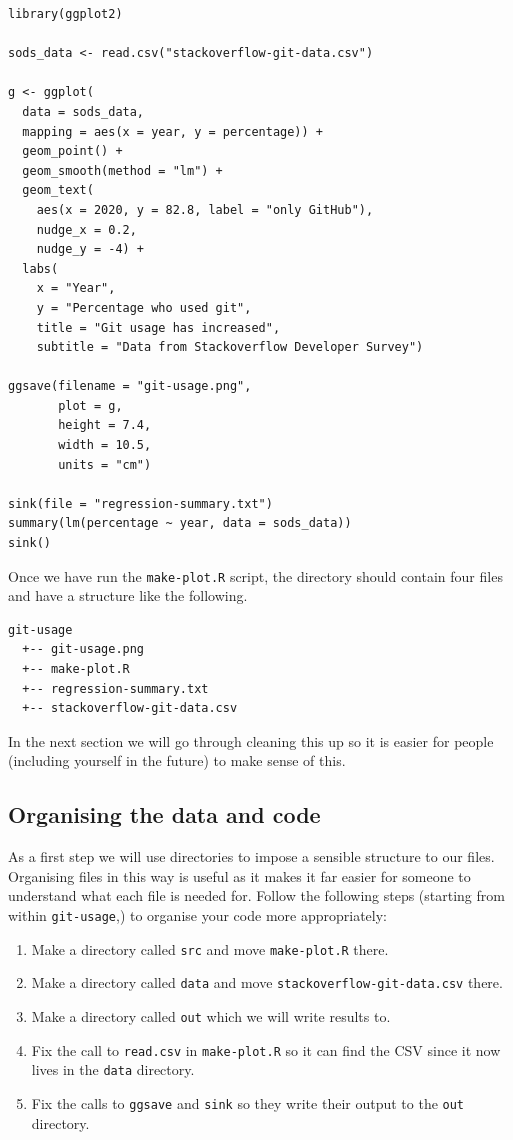 \documentclass[11pt,onecolumn]{scrartcl}
\begin{document}
\lstset{language=r,label= ,caption= ,captionpos=b,numbers=none}
\begin{lstlisting}
library(ggplot2)

sods_data <- read.csv("stackoverflow-git-data.csv")

g <- ggplot(
  data = sods_data,
  mapping = aes(x = year, y = percentage)) +
  geom_point() +
  geom_smooth(method = "lm") +
  geom_text(
    aes(x = 2020, y = 82.8, label = "only GitHub"),
    nudge_x = 0.2,
    nudge_y = -4) +
  labs(
    x = "Year",
    y = "Percentage who used git",
    title = "Git usage has increased",
    subtitle = "Data from Stackoverflow Developer Survey")

ggsave(filename = "git-usage.png",
       plot = g,
       height = 7.4,
       width = 10.5,
       units = "cm")

sink(file = "regression-summary.txt")
summary(lm(percentage ~ year, data = sods_data))
sink()
\end{lstlisting}

Once we have run the \texttt{make-plot.R} script, the directory should contain four files
and have a structure like the following.

\begin{Verbatim}[frame=single,framerule=0.5mm,framesep=2mm,label=Directory contents,xleftmargin=3cm,xrightmargin=3cm]
  git-usage
  +-- git-usage.png
  +-- make-plot.R
  +-- regression-summary.txt
  +-- stackoverflow-git-data.csv
\end{Verbatim}

In the next section we will go through cleaning this up so it is easier for
people (including yourself in the future) to make sense of this.

\subsection{Organising the data and code}
\label{sec:org0958a85}

As a first step we will use directories to impose a sensible structure to our
files. Organising files in this way is useful as it makes it far easier for
someone to understand what each file is needed for. Follow the following steps
(starting from within \texttt{git-usage},) to organise your code more appropriately:

\begin{enumerate}
\item Make a directory called \texttt{src} and move \texttt{make-plot.R} there.
\item Make a directory called \texttt{data} and move \texttt{stackoverflow-git-data.csv} there.
\item Make a directory called \texttt{out} which we will write results to.
\item Fix the call to \texttt{read.csv} in \texttt{make-plot.R} so it can find the CSV since it
now lives in the \texttt{data} directory.
\item Fix the calls to \texttt{ggsave} and \texttt{sink} so they write their output to the \texttt{out}
directory.
\end{enumerate}
\end{document}
